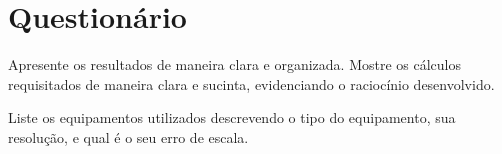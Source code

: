 \cleardoublepage


\vspace{15mm}

\begin{fullwidth}
\noindent{}
\vspace{5mm}

\noindent{}

\noindent{}

\noindent{}

\noindent{}

\noindent{}
\end{fullwidth}

\vspace{5mm}

\section{Questionário}

\begin{question}[type={exam}]{1}
Apresente os resultados de maneira clara e organizada. Mostre os cálculos requisitados de maneira clara e sucinta, evidenciando o raciocínio desenvolvido.
\end{question}

\begin{question}[type={exam}]{1}
Liste os equipamentos utilizados descrevendo o tipo do equipamento, sua resolução, e qual é o seu erro de escala.
\end{question}


